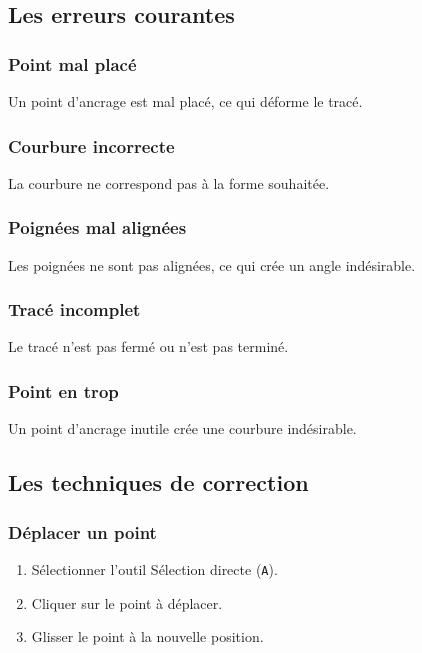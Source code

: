 \subsection{Les erreurs courantes}

\subsubsection{Point mal placé}

Un point d'ancrage est mal placé, ce qui déforme le tracé.

\subsubsection{Courbure incorrecte}

La courbure ne correspond pas à la forme souhaitée.

\subsubsection{Poignées mal alignées}

Les poignées ne sont pas alignées, ce qui crée un angle indésirable.

\subsubsection{Tracé incomplet}

Le tracé n'est pas fermé ou n'est pas terminé.

\subsubsection{Point en trop}

Un point d'ancrage inutile crée une courbure indésirable.

\subsection{Les techniques de correction}

\subsubsection{Déplacer un point}

\begin{enumerate}
    \item Sélectionner l'outil Sélection directe (\texttt{A}).
    \item Cliquer sur le point à déplacer.
    \item Glisser le point à la nouvelle position.
\end{enumerate}


